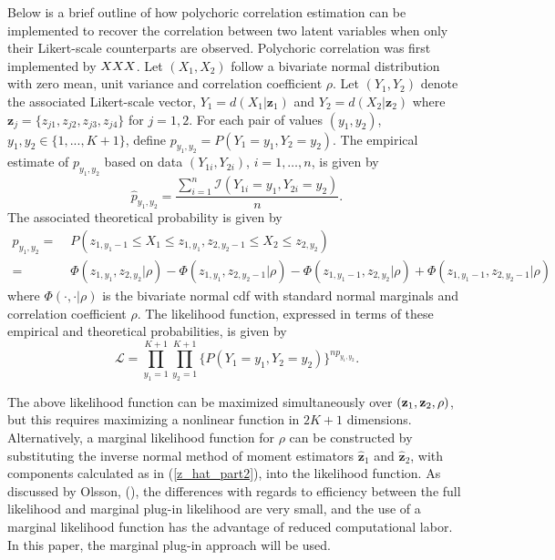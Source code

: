 \documentclass[12pt]{article}
\begin{document}
Below is a brief outline of how polychoric correlation estimation can be implemented to recover the correlation between two latent variables when only their Likert-scale counterparts are observed. Polychoric correlation was first implemented by $\boldmath{XXX}$. Let $(X_1,X_2)$ follow a bivariate normal distribution with zero mean, unit variance and correlation coefficient $\rho$. Let $(Y_1,Y_2)$ denote the associated Likert-scale vector, $Y_1 = d(X_1 | \mathbf{z}_1)
$ and $Y_2 = d(X_2 | \mathbf{z}_2)$ where $\mathbf{z}_{j} = \{z_{j1}, z_{j2},
z_{j3}, z_{j4}\}$ for $j=1,2$. For each pair of values $(y_1, y_2)$, $y_1, y_2 \in \{1,...,K+1\}$, define $p_{y_1,y_2}=P(Y_1 = y_1, Y_2 = y_2)$. The empirical estimate of $p_{y_1,y_2}$ based on data $\left(Y_{1i},Y_{2i} \right) $, $i=1,\ldots,n$,  is given by
\begin{equation*}
\hat{p}_{y_1,y_2} = \frac{\sum_{i = 1}^{n} \mathcal{I} (Y_{1i} = y_1,Y_{2i} = y_2) }{n}.
\end{equation*}
The associated theoretical probability is given by 
\begin{align*}
p_{y_1,y_2} = & \; P(z_{1,y_1-1} \leq X_1 \leq z_{1,y_1}, z_{2,y_2-1} \leq
X_2 \leq z_{2,y_2}) \\
= & \; \Phi(z_{1,y_1}, z_{2,y_2} | \rho) - \Phi(z_{1,y_1}, z_{2,y_2-1} |
\rho) - \Phi(z_{1,y_1-1}, z_{2,y_2} | \rho) + \Phi(z_{1,y_1-1}, z_{2,y_2-1}
| \rho)
\end{align*}
where $\Phi(\cdot,\cdot|\rho)$ is the bivariate normal cdf with standard normal marginals and correlation coefficient $\rho$. The likelihood function, expressed in terms of these empirical and
theoretical probabilities, is given by 
\begin{equation}  \label{CR_likelihood}
\mathcal{L} = \prod^{K+1}_{y_1=1} \prod^{K+1}_{y_2=1} \{ P(Y_1 = y_1, Y_2 =
y_2) \}^{n p_{y_1,y_2}}.
\end{equation}

The above likelihood function can be maximized simultaneously over $(\mathbf{%
z}_1,\mathbf{z}_2,\rho)$, but this requires maximizing a nonlinear function
in $2K+1$ dimensions. Alternatively, a marginal likelihood function for $\rho
$ can be constructed by substituting the inverse normal method of moment
estimators $\mathbf{\hat{z}}_1$ and $\mathbf{\hat{z}}_2$, with components calculated as in (\ref{z_hat_part2}), into the likelihood function.
As discussed by Olsson, (\cite{Olsson79A}), the differences with regards to
efficiency between the full likelihood and marginal plug-in likelihood are very small, and the use of a marginal likelihood function has the advantage of reduced computational labor. In this paper, the marginal plug-in approach will be used.
\end{document}
